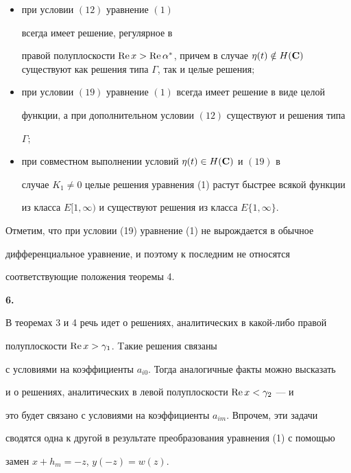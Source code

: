 {\begin{thm}
\begin{itemize}
\item[1.] при условии $(12)$ уравнение $(1)$


всегда имеет решение, регулярное в


правой полуплоскости $\Ree x>\Ree \alpha^*$, причем в случае $\eta(t)\notin


H(\Cc)$ существуют как решения типа $\Gamma$, так и целые решения\/$;$


\item[2.] при условии $(19)$ уравнение $(1)$ всегда имеет решение в виде целой


функции, а при дополнительном условии $(12)$ существуют и решения типа


$\Gamma;$


\item[3.] при совместном выполнении условий $\eta(t)\in H(\bold C)$ и $(19)$ в


случае $K_1\ne 0$ целые решения уравнения (1) растут быстрее всякой функции


из класса $E[1,\infty)$ и существуют решения из класса $E\{ 1,\infty\}$.


\end{itemize}


\end{thm}





Отметим, что при условии (19) уравнение (1) не вырождается в обычное


дифференциальное уравнение, и поэтому к последним не относятся


соответствующие положения теоремы 4.


\medskip





{\bf 6.}


В теоремах 3 и 4 речь идет о решениях, аналитических в какой-либо правой


полуплоскости $\operatorname{Re} x>\gamma_1$. Tакие решения связаны


с условиями на коэффициенты $a_{i0}$. Тогда аналогичные факты можно высказать


и о решениях, аналитических в левой полуплоскости $\operatorname{Re} x<\gamma_2$ --- и


это будет связано с условиями на коэффициенты $a_{im}$. Впрочем, эти задачи


сводятся одна к другой в результате преобразования уравнения (1) с помощью


замен $x+h_m=-z$, $y(-z)=w(z)$.





}
